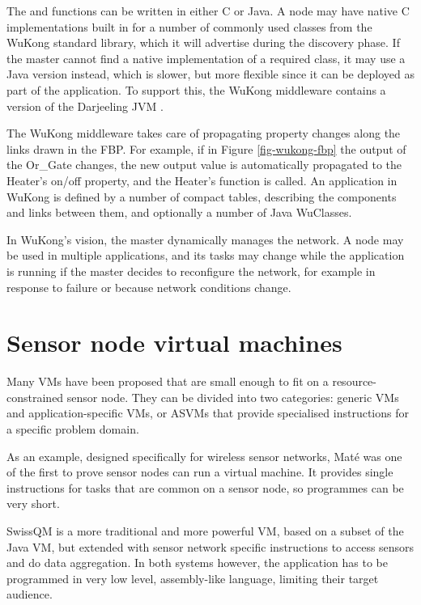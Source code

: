 The  and  functions can be written in either C or Java. A node may have native C implementations built in for a number of commonly used classes from the WuKong standard library, which it will advertise during the discovery phase. If the master cannot find a native implementation of a required class, it may use a Java version instead, which is slower, but more flexible since it can be deployed as part of the application. To support this, the WuKong middleware contains a version of the Darjeeling JVM \cite{Brouwers:2009cj}.


The WuKong middleware takes care of propagating property changes along the links drawn in the FBP. For example, if in Figure \ref{fig-wukong-fbp} the output of the Or\_Gate changes, the new output value is automatically propagated to the Heater's on/off property, and the Heater's  function is called. An application in WuKong is defined by a number of compact tables, describing the components and links between them, and optionally a number of Java WuClasses.

In WuKong's vision, the master dynamically manages the network. A node may be used in multiple applications, and its tasks may change while the application is running if the master decides to reconfigure the network, for example in response to failure \cite{Su:2014uf} or because network conditions change.


\section{Sensor node virtual machines}
Many VMs have been proposed that are small enough to fit on a resource-constrained sensor node. They can be divided into two categories: generic VMs and application-specific VMs, or ASVMs \cite{Culler05} that provide specialised instructions for a specific problem domain.

As an example, designed specifically for wireless sensor networks, Mat\'e \cite{Levis:2002ku} was one of the first to prove sensor nodes can run a virtual machine. It provides single instructions for tasks that are common on a sensor node, so programmes can be very short.  

SwissQM \cite{Muller:2007fs} is a more traditional and more powerful VM, based on a subset of the Java VM, but extended with sensor network specific instructions to access sensors and do data aggregation. In both systems however, the application has to be programmed in very low level, assembly-like language, limiting their target audience.

